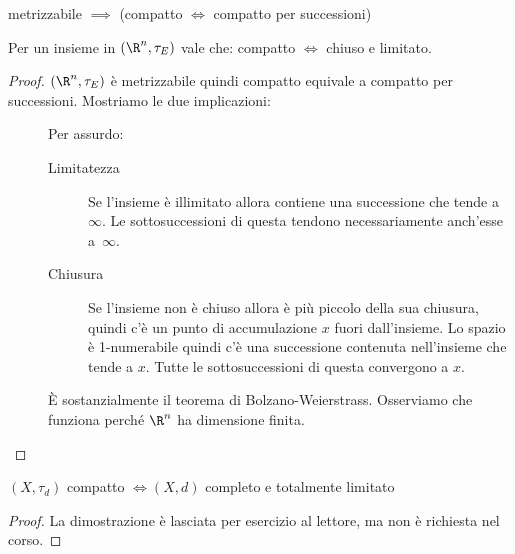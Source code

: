 \begin{cor}
	metrizzabile $\implies$ (compatto $\iff$ compatto per successioni)
\end{cor}

\begin{prop}
	Per un insieme in $(\R^n,\tau_E)$ vale che: compatto $\iff$ chiuso e limitato.
\end{prop}

\begin{proof}
	$(\R^n,\tau_E)$ è metrizzabile quindi compatto equivale a compatto per successioni.
	Mostriamo le due implicazioni:
	\begin{description}
		\item[\proofrightarrow]
			Per assurdo:
			\begin{description}
				\item[Limitatezza]
				Se l'insieme è illimitato allora contiene una successione che tende a~$\infty$.
				Le sottosuccessioni di questa tendono necessariamente anch'esse a~$\infty$.
				\item[Chiusura]
				Se l'insieme non è chiuso allora è più piccolo della sua chiusura, quindi c'è un punto di accumulazione $x$ fuori dall'insieme.
				Lo spazio è \mbox{1-numerabile} quindi c'è una successione contenuta nell'insieme che tende a $x$.
				Tutte le sottosuccessioni di questa convergono a $x$.
			\end{description}
		\item[\proofleftarrow]
			È sostanzialmente il teorema di Bolzano-Weierstrass.
			Osserviamo che funziona perché $\R^n$ ha dimensione finita.
		\qedhere
	\end{description}
\end{proof}

\begin{teo}
	$(X,\tau _d)$ compatto $\iff (X,d)$ completo e totalmente limitato
\end{teo}

\begin{proof}
	La dimostrazione è lasciata per esercizio al lettore, ma non è richiesta nel corso.
\end{proof}
